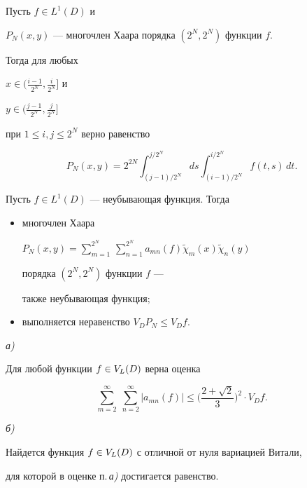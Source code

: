 \begin{lem}


Пусть $f\in L^1(D)$ и


$P_N(x,y)$ --- многочлен Хаара порядка $(2^N, 2^N)$ функции $f$.


Тогда для любых


$x\in \bigl( \frac{i-1}{2^N}, \frac{i}{2^N} \bigr]$ и


$y\in \bigl( \frac{j-1}{2^N}, \frac{j}{2^N} \bigr]$


при $1\leqslant i,j \leqslant 2^N$ верно равенство


$$


P_N(x,y)= 2^{2N} \int_{(j-1)/2^N}^{j/2^N} ds \int_{(i-1)/2^N}^{i/2^N}


f(t,s)\,dt.


$$


\end{lem}





\begin{lem}


Пусть $f\in L^1(D)$ --- неубывающая функция. Тогда


\begin{itemize}


\item[а)] многочлен Хаара


$P_N(x,y)= \sum\limits_{m=1}^{2^N}\,


\sum\limits_{n=1}^{2^N} a_{mn}(f) \widetilde\chi_m(x) \widetilde\chi_n(y)$


порядка $(2^N, 2^N)$ функции $f$ ---


также неубывающая функция$;$


\item[б)] выполняется неравенство $V_D P_N \leqslant V_D f$.


\end{itemize}


\end{lem}





\begin{thm}


{\em а)}


Для любой функции $f\in V_L(D)$ верна оценка


$$


\sum_{m=2}^{\infty}\; \sum_{n=2}^{\infty} |a_{mn}(f)| \leqslant


\bigg(\dfrac{2+\sqrt{2}}{3}\bigg)^2 \cdot V_D f.


$$





{\em б)}


Найдется функция $f\in V_L(D)$ с отличной от нуля вариацией Витали,


для которой в оценке п.\,{\em а)} достигается равенство.


\end{thm}





